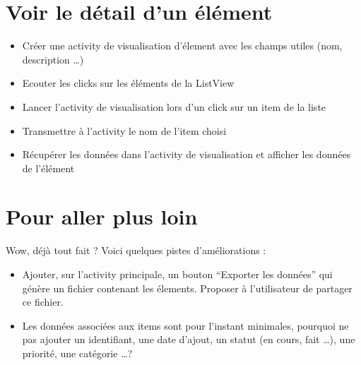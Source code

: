 \documentclass{article}
\begin{document}
 \section{Voir le détail d'un élément}
 \begin{itemize}
  \item Créer une activity de visualisation d'élement avec les champs utiles
  (nom, description \ldots)
  \item Ecouter les clicks sur les éléments de la ListView
  \item Lancer l'activity de visualisation lors d'un click sur un item de la liste
  \item Transmettre à l'activity le nom de l'item choisi
  \item Récupérer les données dans l'activity de visualisation et afficher les
  données de l'élément
 \end{itemize}
 \section{Pour aller plus loin}
	Wow, déjà tout fait ? Voici quelques pistes d'améliorations :
  \begin{itemize}
  \item Ajouter, sur l'activity principale, un bouton ``Exporter les données''
  qui génère un fichier contenant les élements. Proposer à l'utilisateur
  de partager ce fichier.
  \item Les données associées aux items sont pour l'instant minimales, pourquoi ne pas ajouter un identifiant, une date d'ajout, un statut (en cours, fait \ldots), une priorité, une catégorie \ldots ?
\end{itemize}
\end{document}
